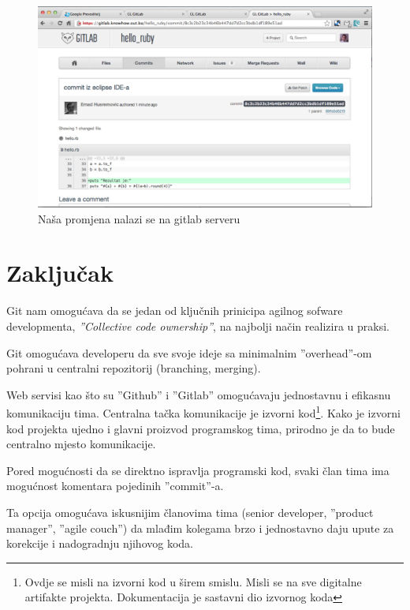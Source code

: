 \documentclass[times, utf8, seminar]{fit}
\begin{document}
\begin{itemize}
\begin{figure}[H]
\centering
\includegraphics[width=15cm]{img/eclipse_git_06.png}
\caption{Naša promjena nalazi se na gitlab serveru}
\end{figure}


\chapter{Zaključak}

Git nam omogućava da se jedan od ključnih prinicipa agilnog sofware developmenta, \emph{''Collective code ownership''}, na najbolji način realizira u praksi.

Git omogućava developeru da sve svoje ideje sa minimalnim ''overhead''-om pohrani u centralni repozitorij (branching, merging).

Web servisi kao što su ''Github'' i ''Gitlab'' omogućavaju jednostavnu i efikasnu komunikaciju tima. Centralna tačka komunikacije je izvorni kod\footnote{Ovdje se misli na izvorni kod u širem smislu. Misli se na sve digitalne artifakte projekta. Dokumentacija je sastavni dio izvornog koda}.
Kako je izvorni kod projekta ujedno i glavni proizvod programskog tima, prirodno je da to bude centralno mjesto komunikacije.

Pored mogućnosti da se direktno ispravlja programski kod, svaki član tima ima mogućnost komentara pojedinih ''commit''-a.

Ta opcija omogućava iskusnijim članovima tima (senior developer, ''product manager'', ''agile couch''\citep{agileart}) da mlađim kolegama brzo i jednostavno daju upute za korekcije i nadogradnju njihovog koda.





\end{itemize}
\end{document}
